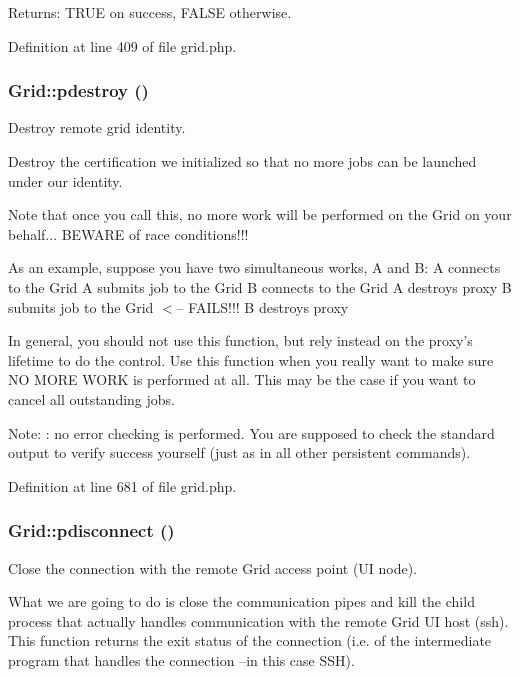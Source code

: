 \begin{Desc}
\item[Returns:]TRUE on success, FALSE otherwise. \end{Desc}


Definition at line 409 of file grid.php.
\subsubsection{\setlength{\rightskip}{0pt plus 5cm}Grid::pdestroy ()}\label{classGrid_a12}


Destroy remote grid identity. 

Destroy the certification we initialized so that no more jobs can be launched under our identity.

Note that once you call this, no more work will be performed on the Grid on your behalf... BEWARE of race conditions!!!

As an example, suppose you have two simultaneous works, A and B: A connects to the Grid A submits job to the Grid B connects to the Grid A destroys proxy B submits job to the Grid $<$-- FAILS!!! B destroys proxy

In general, you should not use this function, but rely instead on the proxy's lifetime to do the control. Use this function when you really want to make sure NO MORE WORK is performed at all. This may be the case if you want to cancel all outstanding jobs.

\begin{Desc}
\item[Note:]: no error checking is performed. You are supposed to check the standard output to verify success yourself (just as in all other persistent commands). \end{Desc}


Definition at line 681 of file grid.php.
\subsubsection{\setlength{\rightskip}{0pt plus 5cm}Grid::pdisconnect ()}\label{classGrid_a10}


Close the connection with the remote Grid access point (UI node). 

What we are going to do is close the communication pipes and kill the child process that actually handles communication with the remote Grid UI host (ssh). This function returns the exit status of the connection (i.e. of the intermediate program that handles the connection --in this case SSH).

